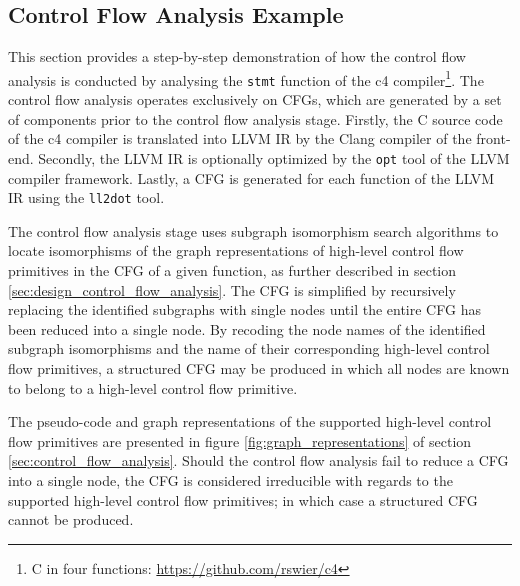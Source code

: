 

\clearpage


\subsection{Control Flow Analysis Example}
\label{app:control_flow_analysis_example}

This section provides a step-by-step demonstration of how the control flow analysis is conducted by analysing the \texttt{stmt} function of the c4 compiler\footnote{C in four functions: \url{https://github.com/rswier/c4}}. The control flow analysis operates exclusively on CFGs, which are generated by a set of components prior to the control flow analysis stage. Firstly, the C source code of the c4 compiler is translated into LLVM IR by the Clang compiler of the front-end. Secondly, the LLVM IR is optionally optimized by the \texttt{opt} tool of the LLVM compiler framework. Lastly, a CFG is generated for each function of the LLVM IR using the \texttt{ll2dot} tool.

The control flow analysis stage uses subgraph isomorphism search algorithms to locate isomorphisms of the graph representations of high-level control flow primitives in the CFG of a given function, as further described in section \ref{sec:design_control_flow_analysis}. The CFG is simplified by recursively replacing the identified subgraphs with single nodes until the entire CFG has been reduced into a single node. By recoding the node names of the identified subgraph isomorphisms and the name of their corresponding high-level control flow primitives, a structured CFG may be produced in which all nodes are known to belong to a high-level control flow primitive.

The pseudo-code and graph representations of the supported high-level control flow primitives are presented in figure \ref{fig:graph_representations} of section \ref{sec:control_flow_analysis}. Should the control flow analysis fail to reduce a CFG into a single node, the CFG is considered irreducible with regards to the supported high-level control flow primitives; in which case a structured CFG cannot be produced.

